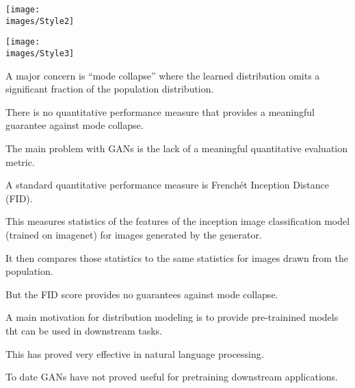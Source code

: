{\centerline{\texttt{[image: \\images/Style2]}}


\centerline{\texttt{[image: \\images/Style3]}}


A major concern is ``mode collapse'' where the learned distribution omits a significant fraction of the population distribution.

\vfill
There is no quantitative performance measure that provides a meaningful guarantee against mode collapse.


The main problem with GANs is the lack of a meaningful quantitative evaluation metric.

\vfill
A standard quantitative performance measure is French\'{e}t Inception Distance (FID).

\vfill
This measures statistics of the features
of the inception image classification model (trained on imagenet) for images generated by the generator.

\vfill
It then compares those statistics
to the same statistics for images drawn from the population.

\vfill
But the FID score provides no guarantees against mode collapse.


A main motivation for distribution modeling is to provide pre-trainined models tht can be used in downstream tasks.

\vfill
This has proved very effective in natural language processing.

\vfill
To date GANs have not proved useful for pretraining downstream applications.


}

